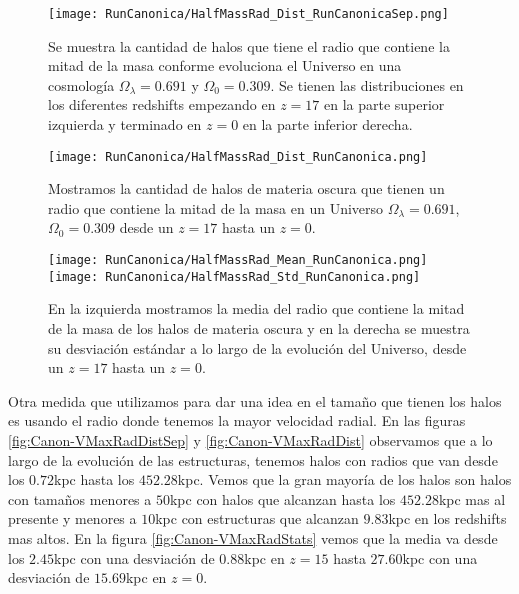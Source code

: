 \begin{figure}[H]
    \centering
    \texttt{[image: RunCanonica/HalfMassRad\_Dist\_RunCanonicaSep.png]}
    \caption[Radio que contiene la mitad de la masa en la evolución de un Universo $\Omega_\lambda = 0.691 $, $\Omega_0 = 0.309$]{\footnotesize Se muestra la cantidad de halos que tiene el radio que contiene la mitad de la masa conforme evoluciona el Universo en una cosmología $\Omega_\lambda = 0.691 $ y $\Omega_0 = 0.309$. Se tienen las distribuciones en los diferentes redshifts empezando en $z=17$ en la parte superior izquierda y terminado en $z=0$ en la parte inferior derecha.}
    \label{fig:Canon-HalfMassRadDistSep}
\end{figure}

\begin{figure}[H]
    \centering
    \texttt{[image: RunCanonica/HalfMassRad\_Dist\_RunCanonica.png]}
    \caption[Distribución del radio que contiene la mitad de la masa en un Universo $\Omega_\lambda = 0.691 $, $\Omega_0 = 0.309$]{\footnotesize Mostramos la cantidad de halos de materia oscura que tienen un radio que contiene la mitad de la masa en un Universo $\Omega_\lambda = 0.691 $, $\Omega_0 = 0.309$ desde un $z=17$ hasta un $z=0$.}
    \label{fig:Canon-HalfMassRadDist}
\end{figure}

\begin{figure}[H]
    \centering
    \texttt{[image: RunCanonica/HalfMassRad\_Mean\_RunCanonica.png]}
    \texttt{[image: RunCanonica/HalfMassRad\_Std\_RunCanonica.png]}
    \caption[Media y desviación estándar del radio de la mitad de la masa de un Universo $\Omega_\lambda = 0.691 $, $\Omega_0 = 0.309$]{\footnotesize En la izquierda mostramos la media del radio que contiene la mitad de la masa de los halos de materia oscura y en la derecha se muestra su desviación estándar a lo largo de la evolución del Universo, desde un $z=17$ hasta un $z=0$.}
    \label{fig:Canon-HalfMassRadStats}
\end{figure}

Otra medida que utilizamos para dar una idea en el tamaño que tienen los halos es usando el radio donde tenemos la mayor velocidad radial. En las figuras \ref{fig:Canon-VMaxRadDistSep} y \ref{fig:Canon-VMaxRadDist} observamos que a lo largo de la evolución de las estructuras, tenemos halos con radios que van desde los $0.72$kpc hasta los $452.28$kpc. Vemos que la gran mayoría de los halos son halos con tamaños menores a $50$kpc con halos que alcanzan hasta los $452.28$kpc mas al presente y menores a $10$kpc con estructuras que alcanzan $9.83$kpc en los redshifts mas altos. En la figura \ref{fig:Canon-VMaxRadStats} vemos que la media va desde los $2.45$kpc con una desviación de $0.88$kpc en $z=15$ hasta $27.60$kpc con una desviación de $15.69$kpc en $z=0$.

